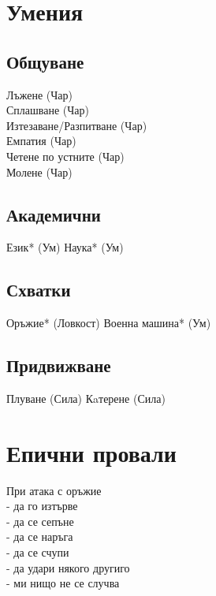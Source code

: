 
\section{Умения}
\subsection{Общуване}
Лъжене (Чар)                      \\
Сплашване (Чар)                   \\
Изтезаване/Разпитване (Чар)       \\
Емпатия (Чар)                     \\
Четене по устните (Чар)           \\
Молене (Чар)                      \\

\subsection{Академични}
Език* (Ум)
Наука* (Ум)

\subsection{Схватки}
Оръжие* (Ловкост)
Военна машина* (Ум)

\subsection{Придвижване}
Плуване (Сила)
Кaтерене (Сила)

\section{Епични провали}
При атака с оръжие           \\
- да го изтърве              \\
- да се сепъне               \\
- да се наръга               \\
- да се счупи                \\
- да удари някого другиго    \\
- ми нищо не се случва       \\
